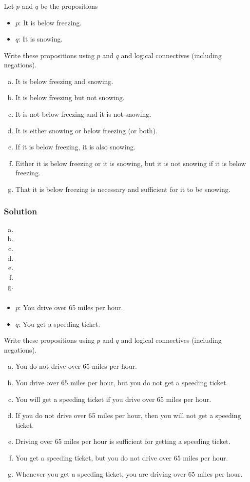 \documentclass[11pt,a4paper]{article}
\newcommand{\problem}[1]{%
\setcounter{subsubsection}{#1}%
\addtocounter{subsubsection}{-1}%
\subsubsection{\hfill}%
}
\newcommand{\solution}{%
\subsubsection*{Solution}%
}
\begin{document}
		\problem{11}
			Let $p$ and $q$ be the propositions
			\begin{itemize}
				\item $p$: It is below freezing.
				\item $q$: It is snowing.
			\end{itemize}
			Write these propositions using $p$ and $q$ and logical connectives (including negations).
			\begin{enumerate}[a)]
				\item It is below freezing and snowing.
				\item It is below freezing but not snowing.
				\item It is not below freezing and it is not snowing.
				\item It is either snowing or below freezing (or both).
				\item If it is below freezing, it is also snowing.
				\item Either it is below freezing or it is snowing,
					but it is not snowing if it is below freezing.
				\item That it is below freezing is necessary and sufficient for it to be snowing.
			\end{enumerate}
		\solution{}
			\begin{enumerate}[a)]
				\item 
				\item 
				\item 
				\item 
				\item 
				\item 
				\item 
			\end{enumerate}
		\problem{13}
			\begin{itemize}
				\item $p$: You drive over 65 miles per hour.
				\item $q$: You get a speeding ticket.
			\end{itemize}
			Write these propositions using $p$ and $q$ and logical connectives (including negations).
			\begin{enumerate}[a)]
				\item You do not drive over 65 miles per hour.
				\item You drive over 65 miles per hour,
					but you do not get a speeding ticket.
				\item You will get a speeding ticket if you drive over 65 miles per hour.
				\item If you do not drive over 65 miles per hour,
					then you will not get a speeding ticket.
				\item Driving over 65 miles per hour is sufficient for getting a speeding ticket.
				\item You get a speeding ticket,
					but you do not drive over 65 miles per hour.
				\item Whenever you get a speeding ticket,
					you are driving over 65 miles per hour.
			\end{enumerate}
\end{document}
